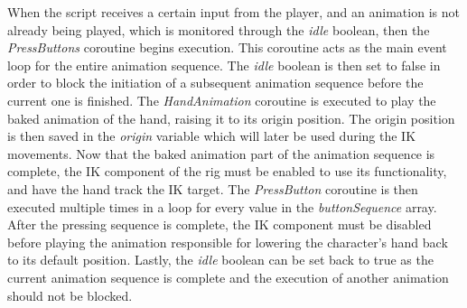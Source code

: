 When the script receives a certain input from the player, and an animation is
not already being played, which is monitored through the \textit{idle} boolean,
then the \textit{PressButtons} coroutine begins execution. This coroutine acts as the
main event loop for the entire animation sequence. The \textit{idle} boolean is
then set to false in order to block the initiation of a subsequent animation
sequence before the current one is finished. The \textit{HandAnimation}
coroutine is executed to play the baked animation of the hand, raising it to its
origin position. The origin position is then saved in the \textit{origin}
variable which will later be used during the IK movements. Now that the baked
animation part of the animation sequence is complete, the IK component of the
rig must be enabled to use its functionality, and have the hand track the IK
target. The \textit{PressButton} coroutine is then executed multiple times in
a loop for every value in the \textit{buttonSequence} array. After the pressing
sequence is complete, the IK component must be disabled before playing the
animation responsible for lowering the character's hand back to its default
position. Lastly, the \textit{idle} boolean can be set back to true as the
current animation sequence is complete and the execution of another animation
should not be blocked.

